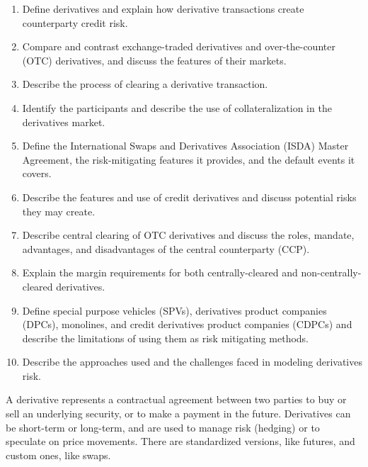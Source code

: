 
\begin{crkeybox}
\begin{enumerate}[label=\textbf{\alph*.},leftmargin=2em]
\item Define derivatives and explain how derivative transactions create counterparty credit risk.
\item Compare and contrast exchange-traded derivatives and over-the-counter (OTC) derivatives, and discuss the features of their markets.
\item Describe the process of clearing a derivative transaction.
\item Identify the participants and describe the use of collateralization in the derivatives market.
\item Define the International Swaps and Derivatives Association (ISDA) Master Agreement, the risk-mitigating features it provides, and the default events it covers.
\item Describe the features and use of credit derivatives and discuss potential risks they may create.
\item Describe central clearing of OTC derivatives and discuss the roles, mandate, advantages, and disadvantages of the central counterparty (CCP).
\item Explain the margin requirements for both centrally-cleared and non-centrally-cleared derivatives.
\item Define special purpose vehicles (SPVs), derivatives product companies (DPCs), monolines, and credit derivatives product companies (CDPCs) and describe the limitations of using them as risk mitigating methods.
\item Describe the approaches used and the challenges faced in modeling derivatives risk.
\end{enumerate}
\end{crkeybox}


\begin{crdefbox}[Derivative]
A derivative represents a contractual agreement between two parties to buy or
sell an underlying security, or to make a payment in the future. Derivatives can
be short-term or long-term, and are used to manage risk (hedging) or to speculate
on price movements. There are standardized versions, like futures, and custom
ones, like swaps.
\end{crdefbox}

